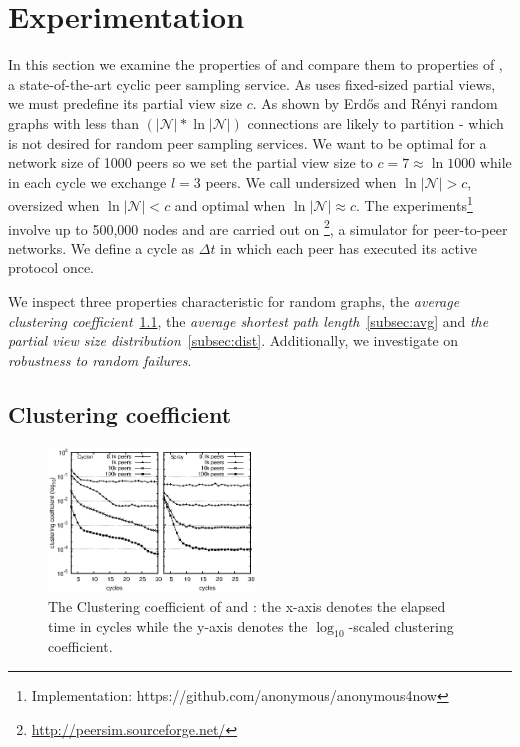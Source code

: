 \section{Experimentation}
\label{sec:experiments}

In this section we examine the properties of \SPRAY{} and compare them to
properties of \CYCLON{}, a state-of-the-art cyclic peer sampling service.  As
\CYCLON{} uses fixed-sized partial views, we must predefine its partial view
size $c$.  As shown by Erd{\H o}s and R{\' e}nyi\cite{erdos1959random} random
graphs with less than $(|\mathcal{N}|*\ln|\mathcal{N}|)$ connections are likely
to partition - which is not desired for random peer sampling services.  We want
\CYCLON{} to be optimal for a network size of 1000 peers so we set the partial
view size to $c=7\approx \ln{1000}$ while in each cycle we exchange $l=3$
peers.  We call \CYCLON{} undersized when $\ln{|\mathcal{N}}| > c$, oversized
when $\ln{|\mathcal{N}|} < c$ and optimal when $\ln{|\mathcal{N}|} \approx c$.
The experiments\footnote{Implementation:
  https://github.com/anonymous/anonymous4now} involve up to 500,000 nodes and
are carried out on \PEERSIM{}\footnote{\url{http://peersim.sourceforge.net/}}, a simulator for peer-to-peer
networks.  We define a cycle as $\Delta t$ in which each peer has executed its
active protocol once.

We inspect three properties characteristic for random graphs, the \emph{average
  clustering coefficient}~\ref{subsec:cluster}, the \emph{average shortest path
  length}~\ref{subsec:avg} and \emph{the partial view size
  distribution}~\ref{subsec:dist}. Additionally, we investigate on
\emph{robustness to random failures}.

\subsection{Clustering coefficient}
\label{subsec:cluster}

\begin{figure}
  \centering
  \includegraphics[width=0.49\textwidth]{img/cluster.eps}
  \caption{\label{fig:clustering}The Clustering coefficient of \SPRAY{} and
      \CYCLON{}: the x-axis denotes the elapsed time in cycles while the y-axis
      denotes the $\log_{10}$-scaled clustering coefficient.
  }
\end{figure}

